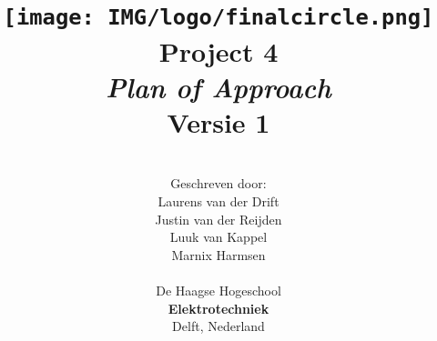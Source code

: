 \title{
\texttt{[image: IMG/logo/finalcircle.png]} \\
\vspace*{1in}
\textbf{Project 4}\\
\textit{Plan of Approach}\\
Versie 1
}
\author{
\vspace*{0.5in} \\
  Geschreven door:\\
  Laurens van der Drift\\
  Justin van der Reijden\\
  Luuk van Kappel\\
  Marnix Harmsen\\
		\vspace*{0.2in} \\
		De Haagse Hogeschool\\
        \textbf{Elektrotechniek}\\
        Delft, Nederland
       } 